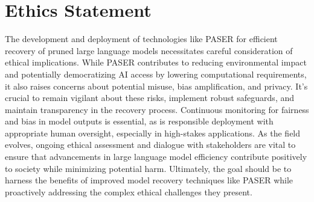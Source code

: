 \section{Ethics Statement}
The development and deployment of technologies like PASER for efficient recovery of pruned large language models necessitates careful consideration of ethical implications. While PASER contributes to reducing environmental impact and potentially democratizing AI access by lowering computational requirements, it also raises concerns about potential misuse, bias amplification, and privacy. It's crucial to remain vigilant about these risks, implement robust safeguards, and maintain transparency in the recovery process. Continuous monitoring for fairness and bias in model outputs is essential, as is responsible deployment with appropriate human oversight, especially in high-stakes applications. As the field evolves, ongoing ethical assessment and dialogue with stakeholders are vital to ensure that advancements in large language model efficiency contribute positively to society while minimizing potential harm. Ultimately, the goal should be to harness the benefits of improved model recovery techniques like PASER while proactively addressing the complex ethical challenges they present.